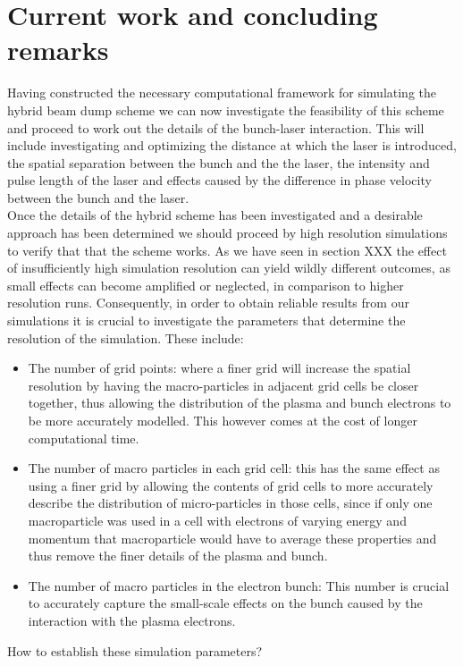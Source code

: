 \chapter{Current work and concluding remarks}
Having constructed the necessary computational framework for simulating the hybrid beam dump scheme we can now investigate the feasibility of this scheme and proceed to work out the details of the bunch-laser interaction. This will include investigating and optimizing the distance at which   the laser is introduced, the spatial separation between the bunch and the the laser, the intensity and pulse length of the laser and effects caused by the difference in phase velocity between the bunch and the laser.\\
Once the details of the hybrid scheme has been investigated and a desirable approach has been determined we should proceed by high resolution simulations to verify that that the scheme works. As we have seen in section XXX the effect of insufficiently high simulation resolution can yield wildly different outcomes, as small effects can become amplified or neglected, in comparison to higher resolution runs. Consequently, in order to obtain reliable results from our simulations it is crucial to investigate the parameters that determine the resolution of the simulation. These include:
\begin{itemize}
\item The number of grid points: where a finer grid will increase the spatial resolution by having the macro-particles in adjacent grid cells be closer together, thus allowing the distribution of the plasma and bunch electrons to be more accurately modelled. This however comes at the cost of longer computational time.
\item The number of macro particles in each grid cell: this has the same effect as using a finer grid by allowing the contents of grid cells to more accurately describe the distribution of micro-particles in those cells, since if only one macroparticle was used in a cell with electrons of varying energy and momentum that macroparticle would have to average these properties and thus remove the finer details of the plasma and bunch.
\item The number of macro particles in the electron bunch: This number is crucial to accurately capture the small-scale effects on the bunch caused by the interaction with the plasma electrons. 
\end{itemize}
How to establish these simulation parameters?\\

